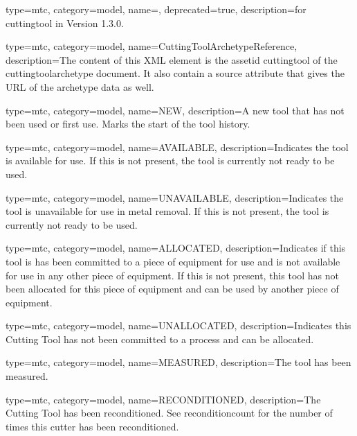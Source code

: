 {
  type=mtc,
  category=model,
  name=,
  deprecated={true},
  description={\DEPRECATED for \gls{cuttingtool} in Version 1.3.0.   \newline {}}
}


{
  type=mtc,
  category=model,
  name={CuttingToolArchetypeReference},
  description={The content of this XML element is the \gls{assetid cuttingtool} of the \gls{cuttingtoolarchetype} document. It \MAY also contain a source attribute that gives the URL of the archetype data as well.}
}


{
  type=mtc,
  category=model,
  name={NEW},
  description={A new tool that has not been used or first use. Marks the start of the tool history.}
}


{
  type=mtc,
  category=model,
  name={AVAILABLE},
  description={Indicates the tool is available for use. If this is not present, the tool is currently not ready to be used.}
}


{
  type=mtc,
  category=model,
  name={UNAVAILABLE},
  description={Indicates the tool is unavailable for use in metal removal. If this is not present, the tool is currently not ready to be used.}
}


{
  type=mtc,
  category=model,
  name={ALLOCATED},
  description={Indicates if this tool is has been committed to a piece of equipment for use and is not available for use in any other piece of equipment. If this is not present, this tool has not been allocated for this piece of equipment and can be used by another piece of equipment.}
}


{
  type=mtc,
  category=model,
  name={UNALLOCATED},
  description={Indicates this Cutting Tool has not been committed to a process and can be allocated.}
}


{
  type=mtc,
  category=model,
  name={MEASURED},
  description={The tool has been measured.}
}


{
  type=mtc,
  category=model,
  name={RECONDITIONED},
  description={The Cutting Tool has been reconditioned. See \gls{reconditioncount} for the number of times this cutter has been reconditioned.}
}


